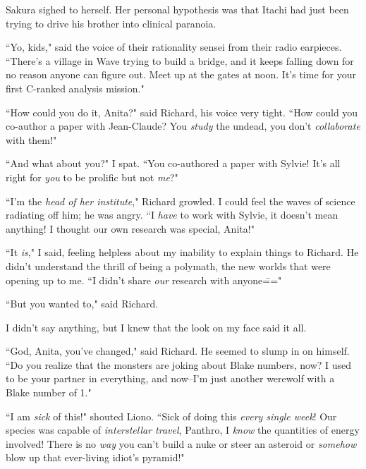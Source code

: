 Sakura sighed to herself. Her personal hypothesis was that Itachi had just been trying to drive his brother into clinical paranoia.

``Yo, kids," said the voice of their rationality sensei from their radio earpieces. ``There's a village in Wave trying to build a bridge, and it keeps falling down for no reason anyone can figure out. Meet up at the gates at noon. It's time for your first C-ranked analysis mission."

\clearpage
{}

``How could you do it, Anita?" said Richard, his voice very tight. ``How could you co-author a paper with Jean-Claude? You \emph{study} the undead, you don't \emph{collaborate} with them!"

``And what about you?" I spat. ``You co-authored a paper with Sylvie! It's all right for \emph{you} to be prolific but not \emph{me}?"

``I'm the \emph{head of her institute}," Richard growled. I could feel the waves of science radiating off him; he was angry. ``I \emph{have} to work with Sylvie, it doesn't mean anything! I thought our own research was special, Anita!"

``It \emph{is}," I said, feeling helpless about my inability to explain things to Richard. He didn't understand the thrill of being a polymath, the new worlds that were opening up to me. ``I didn't share \emph{our} research with anyone\==="

``But you wanted to," said Richard.

I didn't say anything, but I knew that the look on my face said it all.

``God, Anita, you've changed," said Richard. He seemed to slump in on himself. ``Do you realize that the monsters are joking about Blake numbers, now? I used to be your partner in everything, and now\---I'm just another werewolf with a Blake number of 1."


``I am \emph{sick} of this!" shouted Liono. ``Sick of doing this \emph{every single week}! Our species was capable of \emph{interstellar travel}, Panthro, I \emph{know} the quantities of energy involved! There is no \emph{way} you can't build a nuke or steer an asteroid or \emph{somehow} blow up that ever-living idiot's pyramid!"

\clearpage
{}

